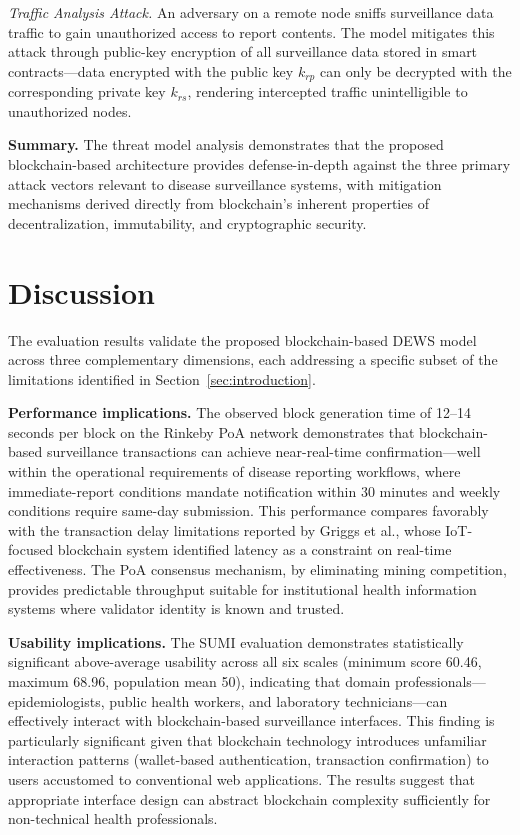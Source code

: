 \documentclass[AMA,LATO1COL]{WileyNJD-v2}
\begin{document}
\textit{Traffic Analysis Attack.} An adversary on a remote node sniffs surveillance data traffic to gain unauthorized access to report contents. The model mitigates this attack through public-key encryption of all surveillance data stored in smart contracts---data encrypted with the public key $k_{rp}$ can only be decrypted with the corresponding private key $k_{rs}$, rendering intercepted traffic unintelligible to unauthorized nodes.

\textbf{Summary.} The threat model analysis demonstrates that the proposed blockchain-based architecture provides defense-in-depth against the three primary attack vectors relevant to disease surveillance systems, with mitigation mechanisms derived directly from blockchain's inherent properties of decentralization, immutability, and cryptographic security.

\section{Discussion}\label{sec:discussion}

The evaluation results validate the proposed blockchain-based DEWS model across three complementary dimensions, each addressing a specific subset of the limitations identified in Section~\ref{sec:introduction}.

\textbf{Performance implications.} The observed block generation time of 12--14 seconds per block on the Rinkeby PoA network demonstrates that blockchain-based surveillance transactions can achieve near-real-time confirmation---well within the operational requirements of disease reporting workflows, where immediate-report conditions mandate notification within 30 minutes and weekly conditions require same-day submission. This performance compares favorably with the transaction delay limitations reported by Griggs et al.,\cite{griggs2018healthcare} whose IoT-focused blockchain system identified latency as a constraint on real-time effectiveness. The PoA consensus mechanism, by eliminating mining competition, provides predictable throughput suitable for institutional health information systems where validator identity is known and trusted.

\textbf{Usability implications.} The SUMI evaluation demonstrates statistically significant above-average usability across all six scales (minimum score 60.46, maximum 68.96, population mean 50), indicating that domain professionals---epidemiologists, public health workers, and laboratory technicians---can effectively interact with blockchain-based surveillance interfaces. This finding is particularly significant given that blockchain technology introduces unfamiliar interaction patterns (wallet-based authentication, transaction confirmation) to users accustomed to conventional web applications. The results suggest that appropriate interface design can abstract blockchain complexity sufficiently for non-technical health professionals.
\end{document}

